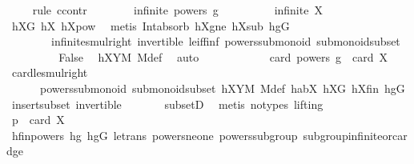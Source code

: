 \begin{isabellebody}
\ \ \ \ \isamarkupfalse%
{\isacharparenleft}{\kern0pt}rule\ ccontr{\isacharparenright}{\kern0pt}\isanewline
\ \ \ \ \ \ \isamarkupfalse%
\ {\isachardoublequoteopen}infinite\ {\isacharparenleft}{\kern0pt}powers\ g{\isacharparenright}{\kern0pt}{\isachardoublequoteclose}\isanewline
\ \ \ \ \ \ \isamarkupfalse%
\ \isamarkupfalse%
\ {\isachardoublequoteopen}infinite\ X{\isachardoublequoteclose}\ \isamarkupfalse%
\ hXG\ hX{}\ hXpow\ \isamarkupfalse%
\ {\isacharparenleft}{\kern0pt}metis\ Int{\isacharunderscore}{\kern0pt}absorb{}\ hXgne\ hXsub\ hgG\ \isanewline
\ \ \ \ \ \ \ \ infinite{\isacharunderscore}{\kern0pt}smul{\isacharunderscore}{\kern0pt}right\ invertible\ le{\isacharunderscore}{\kern0pt}iff{\isacharunderscore}{\kern0pt}inf\ powers{\isacharunderscore}{\kern0pt}submonoid\ submonoid{\isachardot}{\kern0pt}subset{\isacharparenright}{\kern0pt}\isanewline
\ \ \ \ \ \ \isamarkupfalse%
\ \isamarkupfalse%
\ False\ \isamarkupfalse%
\ hXYM\ M{\isacharunderscore}{\kern0pt}def\ \isamarkupfalse%
\ auto\isanewline
\ \ \ \ \isamarkupfalse%
\isanewline
\ \ \ \ \isamarkupfalse%
\ \isamarkupfalse%
\ {\isachardoublequoteopen}card\ {\isacharparenleft}{\kern0pt}powers\ g{\isacharparenright}{\kern0pt}\ {\isasymle}\ card\ X{\isachardoublequoteclose}\ \isamarkupfalse%
\ card{\isacharunderscore}{\kern0pt}le{\isacharunderscore}{\kern0pt}smul{\isacharunderscore}{\kern0pt}right\ \isanewline
\ \ \ \ \ \ powers{\isacharunderscore}{\kern0pt}submonoid\ submonoid{\isachardot}{\kern0pt}subset\ hXYM\ M{\isacharunderscore}{\kern0pt}def\ habX\ hXG\ hXfin\ hgG\ insert{\isacharunderscore}{\kern0pt}subset\ invertible\ \isanewline
\ \ \ \ \ \ subsetD\ \isamarkupfalse%
\ {\isacharparenleft}{\kern0pt}metis\ {\isacharparenleft}{\kern0pt}no{\isacharunderscore}{\kern0pt}types{\isacharcomma}{\kern0pt}\ lifting{\isacharparenright}{\kern0pt}{\isacharparenright}{\kern0pt}\isanewline
\ \ \ \ \isamarkupfalse%
\ \isamarkupfalse%
\ {\isachardoublequoteopen}p\ {\isasymle}\ card\ X{\isachardoublequoteclose}\ \isanewline
\ \ \ \ \ \ \isamarkupfalse%
\ hfinpowers\ hg{}\ hgG\ le{\isacharunderscore}{\kern0pt}trans\ powers{\isacharunderscore}{\kern0pt}ne{\isacharunderscore}{\kern0pt}one\ powers{\isacharunderscore}{\kern0pt}subgroup\ subgroup{\isacharunderscore}{\kern0pt}infinite{\isacharunderscore}{\kern0pt}or{\isacharunderscore}{\kern0pt}card{\isacharunderscore}{\kern0pt}ge\isanewline

\end{isabellebody}

